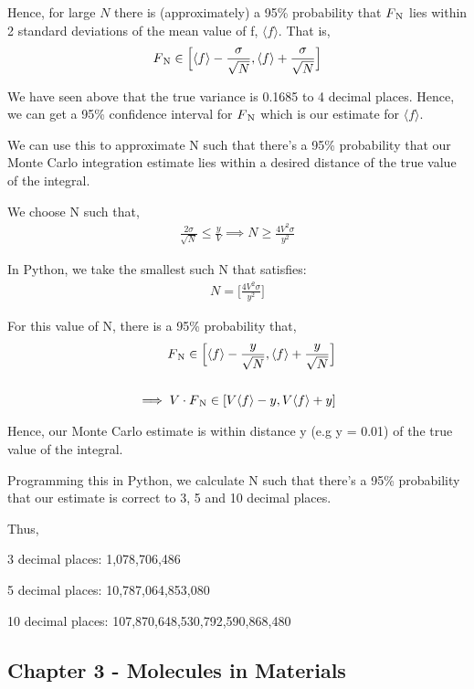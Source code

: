 \documentclass[12pt]{article}
\begin{document}
Hence, for large $N$ there is (approximately) a 95\% probability that $F\textsubscript{N}$ lies within 2 standard deviations of the mean value of f, $\langle f\rangle$. That is, 
 \begin{align} 
F\textsubscript{N} \in \Big[\langle f\rangle - \frac{\sigma}{\sqrt{N}} , \langle f\rangle + \frac{\sigma}{\sqrt{N}} \Big]
\end{align}

We have seen above that the true variance is 0.1685 to 4 decimal places. Hence, we can get a 95\% confidence interval for $F\textsubscript{N} $ which is our estimate for  $\langle f\rangle$.

We can use this to approximate N such that there's a 95\% probability that our Monte Carlo integration estimate lies within a desired distance of the true value of the integral.

We choose N such that,
 \begin{align} 
\frac{2\sigma}{\sqrt{N}} \leq \frac{y}{V} \implies N \geq \frac{4 V ^2\sigma}{y^2}
\end{align}

In Python, we take the smallest such N that satisfies:
 \begin{align} 
N = \Bigg[ \frac{4 V ^2\sigma}{y^2} \Bigg]
\end{align}

For this value of N, there is a 95\% probability that,
 \begin{align} 
F\textsubscript{N} \in \Big[\langle f\rangle - \frac{y}{\sqrt{N}} , \langle f\rangle + \frac{y}{\sqrt{N}} \Big]\\
\\
\implies V \cdot F\textsubscript{N} \in [V\langle f\rangle - y, V \langle f\rangle + y]
\end{align}

Hence, our Monte Carlo estimate is within distance y (e.g y = 0.01) of the true value of the integral.

Programming this in Python, we calculate N such that there's a 95\% probability that our estimate 
is correct to 3, 5 and 10 decimal places.

Thus, 

3 decimal places: 1,078,706,486 

5 decimal places: 10,787,064,853,080 

10 decimal places: 107,870,648,530,792,590,868,480 

\pagebreak

\subsection*{Chapter 3 - Molecules in Materials}
\end{document}
